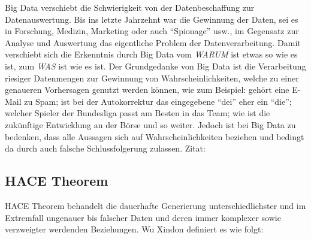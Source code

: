 \documentclass[12pt,journal,compsoc,ngerman]{IEEEtran}
\begin{document}
Big Data verschiebt die Schwierigkeit von der Datenbeschaffung zur Datenauswertung. Bis ins letzte Jahrzehnt war die Gewinnung der Daten, sei es in Forschung, Medizin, Marketing oder auch \enquote{Spionage} usw., im Gegensatz zur Analyse und Auswertung das eigentliche Problem der Datenverarbeitung. Damit verschiebt sich die Erkenntnis durch Big Data vom \emph{WARUM} ist etwas so wie es ist, zum \emph{WAS} ist wie es ist. Der Grundgedanke von Big Data ist die Verarbeitung riesiger Datenmengen zur Gewinnung von Wahrscheinlichkeiten, welche zu einer genaueren Vorhersagen genutzt werden können, wie zum Beispiel: gehört eine E-Mail zu Spam; ist bei der Autokorrektur das eingegebene \enquote{dei} eher ein \enquote{die}; welcher Spieler der Bundesliga passt am Besten in das Team; wie ist die zukünftige Entwicklung an der Börse und so weiter. Jedoch ist bei Big Data zu bedenken, dass alle Aussagen sich auf Wahrscheinlichkeiten beziehen und bedingt da durch auch falsche Schlussfolgerung zulassen. Zitat: 

\subsection{HACE Theorem}
 HACE Theorem behandelt die dauerhafte Generierung unterschiedlichster und im Extremfall ungenauer bis falscher Daten und deren immer komplexer sowie verzweigter werdenden Beziehungen. Wu Xindon definiert es wie folgt: 
\end{document}

